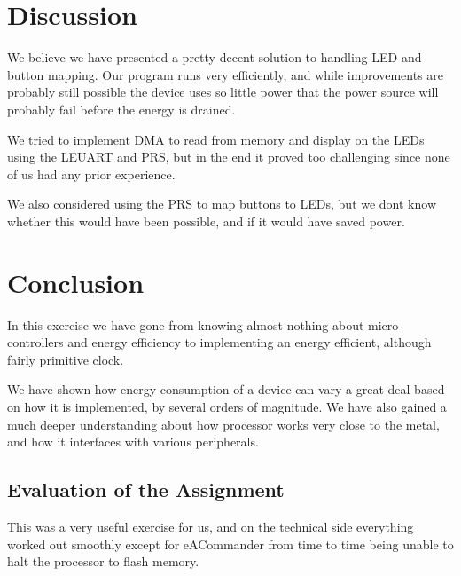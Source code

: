 \chapter{Discussion}
We believe we have presented a pretty decent solution to handling LED and button mapping. Our program runs very efficiently, and while improvements are probably still possible the device uses so little power that the power source will probably fail before the energy is drained.

We tried to implement DMA to read from memory and display on the LEDs using the LEUART and PRS, but in the end it proved too challenging since none of us had any prior experience. 

We also considered using the PRS to map buttons to LEDs, but we dont know whether this would have been possible, and if it would have saved power.

\chapter{Conclusion}
In this exercise we have gone from knowing almost nothing about micro-controllers and energy efficiency to implementing an energy efficient, although fairly primitive clock.

We have shown how energy consumption of a device can vary a great deal based on how it is implemented, by several orders of magnitude. We have also gained a much deeper understanding about how  processor works very close to the metal, and how it interfaces with various peripherals.

\section{Evaluation of the Assignment}
This was a very useful exercise for us, and on the technical side everything worked out smoothly except for eACommander from time to time being unable to halt the processor to flash memory.